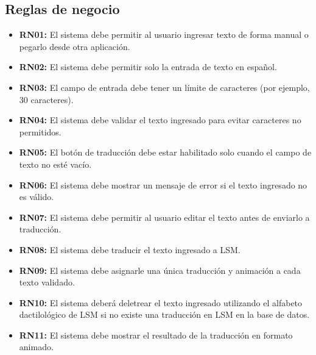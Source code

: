 \subsection{Reglas de negocio}
\begin{itemize}[leftmargin=1.5cm]
    \item \textbf{RN01:} El sistema debe permitir al usuario ingresar texto de forma manual o pegarlo desde otra aplicación.
    \item \textbf{RN02:} El sistema debe permitir solo la entrada de texto en español.
    \item \textbf{RN03:} El campo de entrada debe tener un límite de caracteres (por ejemplo, 30 caracteres).
    \item \textbf{RN04:} El sistema debe validar el texto ingresado para evitar caracteres no permitidos.
    \item \textbf{RN05:} El botón de traducción debe estar habilitado solo cuando el campo de texto no esté vacío.
    \item \textbf{RN06:} El sistema debe mostrar un mensaje de error si el texto ingresado no es válido.
    \item \textbf{RN07:} El sistema debe permitir al usuario editar el texto antes de enviarlo a traducción.
    \item \textbf{RN08:} El sistema debe traducir el texto ingresado a LSM.
    \item \textbf{RN09:} El sistema debe asignarle una única traducción y animación a cada texto validado.
    \item \textbf{RN10:} El sistema deberá deletrear el texto ingresado utilizando el alfabeto dactilológico de LSM si no existe una traducción en LSM en la base de datos.
    \item \textbf{RN11:} El sistema debe mostrar el resultado de la traducción en formato animado.
\end{itemize}
